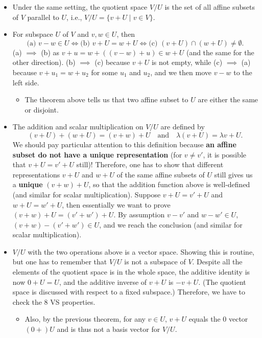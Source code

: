 \documentclass{article}
\begin{document}
\begin{itemize}
\begin{itemize}
    \end{itemize}
    \item Under the same setting, the quotient space $V/U$ is the set of all affine subsets of $V$ parallel to $U$, i.e., $V/U = \{v+U \mid v \in V\}$.
    \item For subspace $U$ of $V$ and $v,w \in U$, then
        \begin{equation*}
            \text{(a) } v-w \in U \iff \text{(b) } v+U = w+U \iff \text{(c) } (v+U) \cap (w+U) \not= \emptyset.
        \end{equation*}
    (a) $\implies$ (b) as $v+u = w+((v-w)+u) \in w+U$ (and the same for the other direction). (b) $\implies$ (c) because $v+U$ is not empty, while (c) $\implies$ (a) because $v+u_1=w+u_2$ for some $u_1$ and $u_2$, and we then move $v-w$ to the left side.
    \begin{itemize}
        \item The theorem above tells us that two affine subset to $U$ are either the same or  disjoint.
    \end{itemize}
    \item The addition and scalar multiplication on $V/U$ are defined by  $$(v+U)+(w+U) = (v+w)+U \quad \text{and} \quad \lambda(v+U) = \lambda v + U.$$ We should pay particular attention to this definition because \textbf{an affine subset do not have a unique representation} (for $v \not= v'$, it is possible that $v+U = v'+U$ still)! Therefore, one has to show that  different representations $v+U$ and $w+U$ of the same affine subsets of $U$ still gives us a \textbf{unique} $(v+w)+U$, so that the addition function above is well-defined (and similar for scalar multiplication). Suppose $v+U = v'+U$ and $w+U = w'+U$, then essentially we want to prove $(v+w)+U=(v'+w')+U$. By assumption $v-v'$ and $w-w' \in U$, $(v+w)-(v'+w') \in U$, and we reach the conclusion (and similar for scalar multiplication).
    \item $V/U$ with the two operations above is a vector space. Showing this is routine, but one has to remember that $V/U$ is not a subspace of $V$. Despite all the elements of the quotient space is in the whole space, the additive identity is now $0+U=U$, and the additive inverse of $v+U$ is $-v+U$. (The quotient space is discussed with respect to a fixed subspace.) Therefore, we have to check the 8 VS properties.
    \begin{itemize}
        \item Also, by the previous theorem, for any $v \in U$, $v+U$ equals the 0 vector $(0+)U$ and is thus not a basis vector for $V/U$.

\end{itemize}
\end{itemize}
\end{document}
